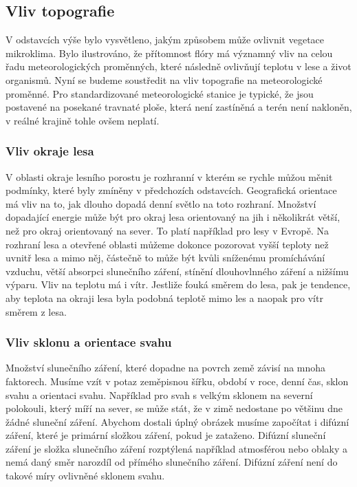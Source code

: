 \subsection{Vliv topografie} \label{chap:topo}
V odstavcích výše bylo vysvětleno, jakým způsobem může ovlivnit vegetace mikroklima. Bylo ilustrováno, že přítomnost flóry má významný vliv na celou řadu meteorologických proměnných, které následně ovlivňují teplotu v lese a život organismů. Nyní se budeme soustředit na vliv topografie na meteorologické proměnné. Pro standardizované meteorologické stanice je typické, že jsou postavené na posekané travnaté ploše, která není zastíněná a terén není nakloněn, v reálné krajině tohle ovšem neplatí.

\subsubsection{Vliv okraje lesa}
V oblasti okraje lesního porostu je rozhranní v kterém se rychle můžou měnit podmínky, které byly zmíněny v předchozích odstavcích. Geografická orientace má vliv na to, jak dlouho dopadá denní světlo na toto rozhraní. Množství dopadající energie může být pro okraj lesa orientovaný na jih i několikrát větší, než pro okraj orientovaný na sever. To platí například pro lesy v Evropě. Na rozhraní lesa a otevřené oblasti můžeme dokonce pozorovat vyšší teploty než uvnitř lesa a mimo něj, částečně to může být kvůli sníženému promíchávání vzduchu, větší absorpci slunečního záření, stínění dlouhovlnného záření a nižšímu výparu. Vliv na teplotu má i vítr. Jestliže fouká směrem do lesa, pak je tendence, aby teplota na okraji lesa byla podobná teplotě mimo les a naopak pro vítr směrem z lesa\cite{alma}.

\subsubsection{Vliv sklonu a orientace svahu}
Množství slunečního záření, které dopadne na povrch země závisí na mnoha faktorech. Musíme vzít v potaz zeměpisnou šířku, období v roce, denní čas, sklon svahu a orientaci svahu. Například pro svah s velkým sklonem na severní polokouli, který míří na sever, se může stát, že v zimě nedostane po většinu dne žádné sluneční záření. Abychom dostali úplný obrázek musíme započítat i difúzní záření, které je primární složkou záření, pokud je zataženo. Difúzní sluneční záření je složka slunečního záření rozptýlená například atmosférou nebo oblaky a nemá daný směr narozdíl od přímého slunečního záření. Difúzní záření není do takové míry ovlivněné sklonem svahu\cite{alma}.

